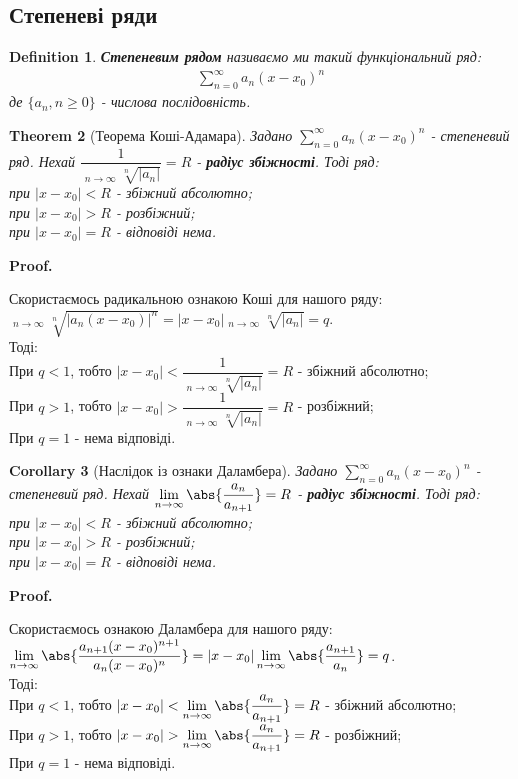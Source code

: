 \documentclass[a4paper, 10pt]{article}
\makeatletter
\DeclareMathOperator*\uplim{\overline{lim}}
\def\huge{\displaystyle}
\def\qed{$\blacksquare$}
\theoremstyle{theoremdd}
\newtheorem{theorem}{Theorem}[subsection]
\theoremstyle{theoremdd}
\theoremstyle{theoremdd}
\newtheorem{definition}[theorem]{Definition}
\theoremstyle{theoremdd}
\theoremstyle{theoremdd}
\theoremstyle{theoremdd}
\theoremstyle{theoremdd}
\theoremstyle{theoremdd}
\theoremstyle{theoremdd}
\newtheorem{corollary}[theorem]{Corollary}
\renewenvironment{proof}[1][Proof.\\]{\par
\pushQED{\hfill \qed}%
\normalfont \topsep6\p@\@plus6\p@\relax
\trivlist
\item\relax
{\bfseries
#1\@addpunct{.}}\hspace\labelsep\ignorespaces
}{%
\popQED\endtrivlist\@endpefalse
}
\makeatother
\begin{document}
\subsection{Степеневі ряди}
\begin{definition}
\textbf{Степеневим рядом} називаємо ми такий функціональний ряд:
\begin{align*}
\sum_{n=0}^\infty a_n(x-x_0)^n
\end{align*}
де $\{a_n, n \geq 0\}$ - числова послідовність.
\end{definition}

\begin{theorem}[Теорема Коші-Адамара]
Задано $\huge \sum_{n=0}^\infty a_n(x-x_0)^n$ - степеневий ряд. Нехай $\dfrac{1}{\huge \uplim_{n \to \infty} \sqrt[n]{|a_n|}} = R$ - \textbf{радіус збіжності}. Тоді ряд:\\
при $|x-x_0|<R$ - збіжний абсолютно;\\
при $|x-x_0|>R$ - розбіжний;\\
при $|x-x_0|=R$ - відповіді нема.
\end{theorem}

\begin{proof}
Скористаємось радикальною ознакою Коші для нашого ряду:\\
$\huge \uplim_{n \to \infty} \sqrt[n]{|a_n(x-x_0)|^n} = |x-x_0| \uplim_{n \to \infty} \sqrt[n]{|a_n|} = q$.\\
Тоді:\\
При $q < 1$, тобто $|x-x_0| < \dfrac{1}{\huge \uplim_{n \to \infty} \sqrt[n]{|a_n|}} = R$ - збіжний абсолютно;\\
При $q > 1$, тобто $|x-x_0| > \dfrac{1}{\huge \uplim_{n \to \infty} \sqrt[n]{|a_n|}} = R$ - розбіжний;\\
При $q = 1$ - нема відповіді.
\end{proof}

\begin{corollary}[Наслідок із ознаки Даламбера]
Задано $\huge \sum_{n=0}^\infty a_n(x-x_0)^n$ - степеневий ряд. Нехай $\huge \lim_{n \to \infty} \abs{\dfrac{a_n}{a_{n+1}}} = R$ - \textbf{радіус збіжності}. Тоді ряд:\\
при $|x-x_0|<R$ - збіжний абсолютно;\\
при $|x-x_0|>R$ - розбіжний;\\
при $|x-x_0|=R$ - відповіді нема.
\end{corollary}

\begin{proof}
Скористаємось ознакою Даламбера для нашого ряду:\\
$\huge \lim_{n \to \infty} \abs{\dfrac{a_{n+1}(x-x_0)^{n+1}}{a_n(x-x_0)^n}} = |x-x_0| \lim_{n \to \infty} \abs{\dfrac{a_{n+1}}{a_n}} = q$.\\
Тоді:\\
При $q < 1$, тобто $|x-x_0| < \huge \lim_{n \to \infty} \abs{\dfrac{a_n}{a_{n+1}}} = R$ - збіжний абсолютно;\\
При $q > 1$, тобто $|x-x_0| > \huge \lim_{n \to \infty} \abs{\dfrac{a_n}{a_{n+1}}} = R$ - розбіжний;\\
При $q = 1$ - нема відповіді.
\end{proof}
\end{document}
